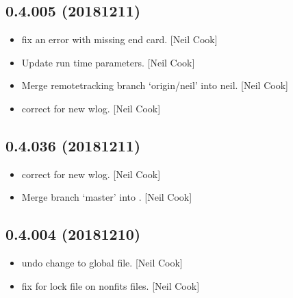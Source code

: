 \documentclass[a4paper,10pt,english]{report}
\begin{document}
\subsection{0.4.005 (2018\sphinxhyphen{}12\sphinxhyphen{}11)}
\label{\detokenize{misc/changelog:id257}}\begin{itemize}
\item {} 
 \sphinxhyphen{} fix an error with missing end card. {[}Neil Cook{]}

\item {} 
Update  run time parameters. {[}Neil Cook{]}

\item {} 
Merge remote\sphinxhyphen{}tracking branch ‘origin/neil’ into neil. {[}Neil Cook{]}

\item {} 
 \sphinxhyphen{} correct  for new wlog. {[}Neil
Cook{]}

\end{itemize}


\subsection{0.4.036 (2018\sphinxhyphen{}12\sphinxhyphen{}11)}
\label{\detokenize{misc/changelog:id258}}\begin{itemize}
\item {} 
 \sphinxhyphen{} correct  for new wlog. {[}Neil
Cook{]}

\item {} 
Merge branch ‘master’ into . {[}Neil Cook{]}

\end{itemize}


\subsection{0.4.004 (2018\sphinxhyphen{}12\sphinxhyphen{}10)}
\label{\detokenize{misc/changelog:id259}}\begin{itemize}
\item {} 
 \sphinxhyphen{} undo change to global file. {[}Neil Cook{]}

\item {} 
 \sphinxhyphen{} fix for lock file on non\sphinxhyphen{}fits files. {[}Neil Cook{]}

\end{itemize}
\end{document}
